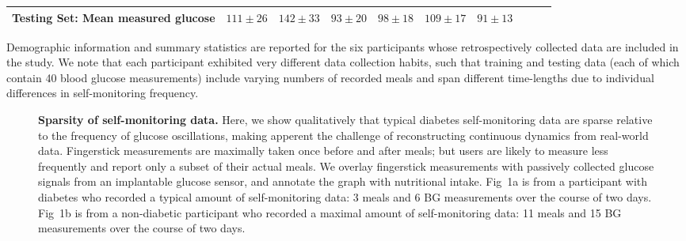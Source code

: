 \documentclass[10pt,letterpaper]{article}
\begin{document}
\begin{table}[!ht]
\begin{adjustwidth}{-2.25in}{0in}
\begin{tabular}{|l|c|c|c|c|c|c|c|c|c|}
Testing Set: Mean measured glucose & $111 \pm 26$  & $142 \pm 33$  & $93 \pm 20$  & $98 \pm 18$ & $109 \pm 17$  & $91 \pm 13$ \\ \hline
\end{tabular}
\begin{flushleft} Demographic information and summary statistics are reported for the six participants whose retrospectively collected data are included in the study. We note that each participant exhibited very different data collection habits, such that training and testing data (each of which contain 40 blood glucose measurements) include varying numbers of recorded meals and span different time-lengths due to individual differences in self-monitoring frequency. 
\end{flushleft}
\end{adjustwidth}
\end{table}

\begin{figure}[!h]
\begin{adjustwidth}{-2.25in}{0in} %
  \centering
  \caption{{\bf Sparsity of self-monitoring data.} Here, we show qualitatively that typical diabetes self-monitoring data are sparse relative to the frequency of glucose oscillations, making apperent the challenge of reconstructing continuous dynamics from real-world data. Fingerstick measurements are maximally taken once before and after meals; but users are likely to measure less frequently and report only a subset of their actual meals.
  We overlay fingerstick measurements with passively collected glucose signals from an implantable glucose sensor, and annotate the graph with nutritional intake.
 Fig~1a is from a participant with diabetes who recorded a typical amount of self-monitoring data: 3 meals and 6 BG measurements over the course of two days. Fig~1b is from a non-diabetic participant who recorded a maximal amount of self-monitoring data: 11 meals and 15 BG measurements over the course of two days.}
  \label{fig:sparseData}
  \end{adjustwidth}
\end{figure}
\end{document}
